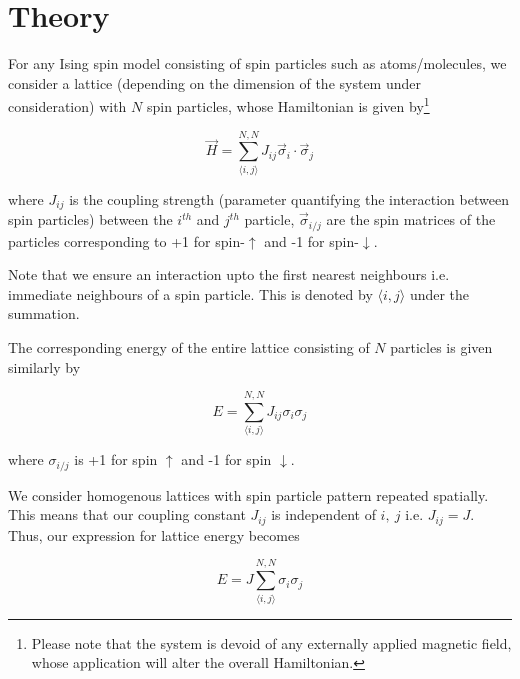 \section{Theory}
\label{sec:theory} 

For any Ising spin model consisting of spin particles such as atoms/molecules, we consider a lattice (depending on the dimension of the system under consideration) with \( N \) spin particles, whose Hamiltonian is given by\footnote{Please note that the system is devoid of any externally applied magnetic field, whose application will alter the overall Hamiltonian.}

\begin{equation}
    \vec{H} = \sum_{\langle i, j \rangle}^{N, N} J_{ij} \vec{\sigma}_i \cdot \vec{\sigma}_j
\end{equation}

where \( J_{ij} \) is the coupling strength (parameter quantifying the interaction between spin particles) between the \( i^{th} \) and \( j^{th} \) particle, \( \vec{\sigma}_{i/j} \) are the spin matrices of the particles corresponding to +1 for spin-\( \uparrow \) and -1 for spin-\( \downarrow \).

Note that we ensure an interaction upto the first nearest neighbours i.e. immediate neighbours of a spin particle.
This is denoted by \( \langle i, j \rangle \) under the summation. 

The corresponding energy of the entire lattice consisting of \( N \) particles is given similarly by

\begin{equation}
    E = \sum_{\langle i, j \rangle}^{N, N} J_{ij} \sigma_i  \sigma_j
\end{equation}

where \( \sigma_{i/j} \) is +1 for spin \( \uparrow \) and -1 for spin \( \downarrow \).

We consider homogenous lattices with spin particle pattern repeated spatially.
This means that our coupling constant \( J_{ij} \) is independent of \( i, \: j \) i.e. \( J_{ij} = J \).
Thus, our expression for lattice energy becomes

\begin{equation}
    E = J \sum_{\langle i, j \rangle}^{N, N} \sigma_i  \sigma_j
\end{equation}
